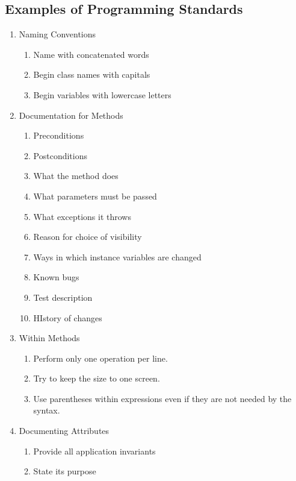 \documentclass{report}
\begin{document}
		    \subsection{Examples of Programming Standards}
		    	\begin{enumerate}
		    		\item Naming Conventions
			    		\begin{enumerate}
			    			\item Name with concatenated words
			    			\item Begin class names with capitals
			    			\item Begin variables with lowercase letters
			    		\end{enumerate}
			    	\item Documentation for Methods
			    		\begin{enumerate}
			    			\item Preconditions
			    			\item Postconditions
			    			\item What the method does
			    			\item What parameters must be passed
			    			\item What exceptions it throws
			    			\item Reason for choice of visibility
			    			\item Ways in which instance variables are changed
			    			\item Known bugs
			    			\item Test description
			    			\item HIstory of changes
			    		\end{enumerate}
			    	\item Within Methods
			    		\begin{enumerate}
			    			\item Perform only one operation per line.
			    			\item Try to keep the size to one screen.
			    			\item Use parentheses within expressions even if they are not needed by the syntax.
			    		\end{enumerate}
			    	\item Documenting Attributes
			    		\begin{enumerate}
			    			\item Provide all application invariants
			    			\item State its purpose
			    		\end{enumerate}
		    	\end{enumerate}
\end{document}
